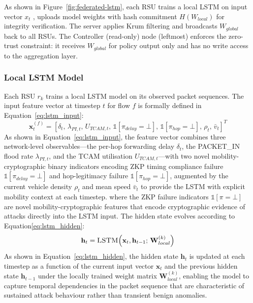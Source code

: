 \documentclass[12pt, a4paper]{report}
\begin{document}
As shown in Figure~\ref{fig:federated-lstm}, each RSU trains a
local LSTM on input vector $x_t$ , uploads model weights with hash
commitment $H(W_{local})$ for integrity verification. The server
applies Krum filtering and broadcasts $W_{global}$ back to all RSUs.
The Controller (read-only) node (leftmost) enforces the zero-trust
constraint: it receives $W_{global}$ for policy output only and has
no write access to the aggregation layer.

\subsubsection{Local LSTM Model}
Each RSU $r_k$ trains a local LSTM model on its observed packet
sequences. The input feature vector at timestep $t$ for flow $f$
is formally defined in Equation~\eqref{eq:lstm_input}:
\begin{equation}
\mathbf{x}_t^{(f)} = \left[\delta_t,\, \lambda_{PI,t},\,
U_{TCAM,t},\, \mathbb{1}[\pi_{delay}=\bot],\,
\mathbb{1}[\pi_{hop}=\bot],\, \rho_t,\, \bar{v}_t \right]^T
\label{eq:lstm_input}
\end{equation}
As shown in Equation~\eqref{eq:lstm_input}, the feature vector
combines three network-level observables---the per-hop forwarding
delay $\delta_t$, the PACKET\_IN flood rate $\lambda_{PI,t}$, and the
TCAM utilisation $U_{TCAM,t}$---with two novel mobility-cryptographic
binary indicators encoding ZKP timing compliance failure
$\mathbb{1}[\pi_{delay}=\bot]$ and hop-legitimacy failure
$\mathbb{1}[\pi_{hop}=\bot]$, augmented by the current vehicle density
$\rho_t$ and mean speed $\bar{v}_t$ to provide the LSTM with explicit
mobility context at each timestep.
where the ZKP failure indicators $\mathbb{1}[\pi=\bot]$ are novel
mobility-cryptographic features that encode cryptographic evidence
of attacks directly into the LSTM input. The hidden state evolves
according to Equation\eqref{eq:lstm_hidden}:
\begin{equation}
\mathbf{h}_t = \textsc{LSTM}\!\left(\mathbf{x}_t, \mathbf{h}_{t-1};\,
\mathbf{W}_{local}^{(k)}\right)
\label{eq:lstm_hidden}
\end{equation}
As shown in Equation~\eqref{eq:lstm_hidden}, the hidden state
$\mathbf{h}_t$ is updated at each timestep as a function of the
current input vector $\mathbf{x}_t$ and the previous hidden state
$\mathbf{h}_{t-1}$ under the locally trained weight matrix
$\mathbf{W}_{local}^{(k)}$, enabling the model to capture temporal
dependencies in the packet sequence that are characteristic of
sustained attack behaviour rather than transient benign anomalies.
\end{document}
